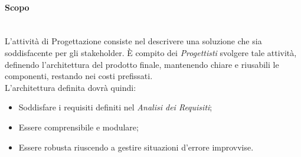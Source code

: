 \paragraph{Scopo}
\label{Progettazione_Scopo} \-\\
L'attività di Progettazione consiste nel descrivere una soluzione che sia soddisfacente per gli stakeholder\glossario. È compito dei \textit{Progettisti} svolgere tale attività, definendo l'architettura del prodotto finale, mantenendo chiare e riusabili le componenti, restando nei costi prefissati.\\
L'architettura definita dovrà quindi:
\begin{itemize}
	\item Soddisfare i requisiti definiti nel \textit{Analisi dei Requisiti};
	\item Essere comprensibile e modulare;
	\item Essere robusta riuscendo a gestire situazioni d'errore improvvise.
\end{itemize}

